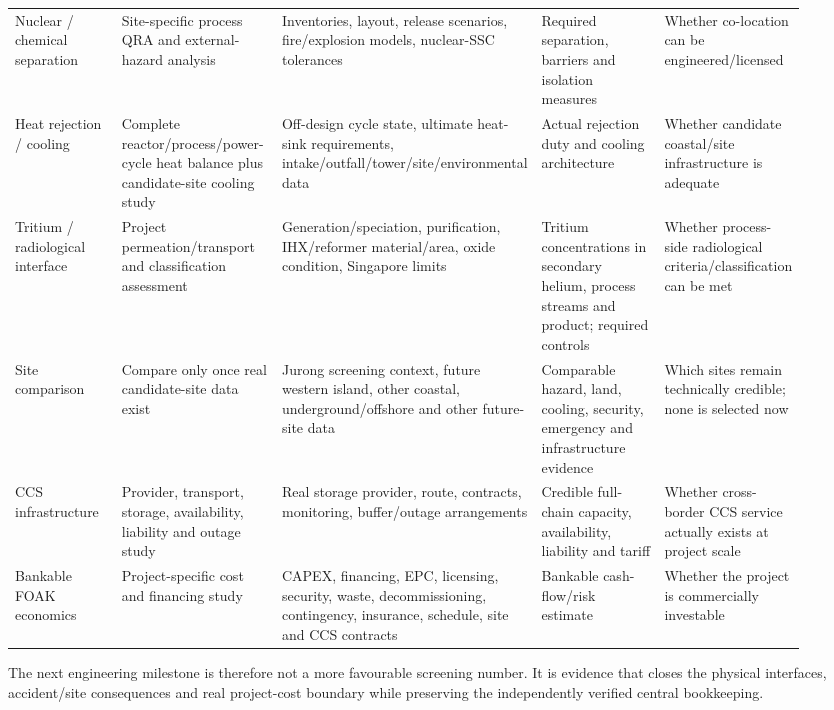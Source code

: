 \begin{longtable}{p{0.15\linewidth}p{0.21\linewidth}p{0.21\linewidth}p{0.19\linewidth}p{0.16\linewidth}}
Nuclear / chemical separation &
Site-specific process QRA and external-hazard analysis &
Inventories, layout, release scenarios, fire/explosion models, nuclear-SSC tolerances &
Required separation, barriers and isolation measures &
Whether co-location can be engineered/licensed\\

Heat rejection / cooling &
Complete reactor/process/power-cycle heat balance plus candidate-site cooling study &
Off-design cycle state, ultimate heat-sink requirements, intake/outfall/tower/site/environmental data &
Actual rejection duty and cooling architecture &
Whether candidate coastal/site infrastructure is adequate\\

Tritium / radiological interface &
Project permeation/transport and classification assessment &
Generation/speciation, purification, IHX/reformer material/area, oxide condition, Singapore limits &
Tritium concentrations in secondary helium, process streams and product; required controls &
Whether process-side radiological criteria/classification can be met\\

Site comparison &
Compare only once real candidate-site data exist &
Jurong screening context, future western island, other coastal, underground/offshore and other future-site data &
Comparable hazard, land, cooling, security, emergency and infrastructure evidence &
Which sites remain technically credible; none is selected now\\

CCS infrastructure &
Provider, transport, storage, availability, liability and outage study &
Real storage provider, route, contracts, monitoring, buffer/outage arrangements &
Credible full-chain capacity, availability, liability and tariff &
Whether cross-border CCS service actually exists at project scale\\

Bankable FOAK economics &
Project-specific cost and financing study &
CAPEX, financing, EPC, licensing, security, waste, decommissioning, contingency, insurance, schedule, site and CCS contracts &
Bankable cash-flow/risk estimate &
Whether the project is commercially investable\\
\bottomrule
\end{longtable}
\endgroup

The next engineering milestone is therefore not a more favourable screening number.  It is evidence that closes the physical interfaces, accident/site consequences and real project-cost boundary while preserving the independently verified central bookkeeping.
